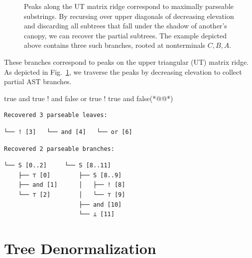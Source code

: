 \documentclass[sigplan,nonacm]{acmart}\settopmatter{printfolios=false,printccs=false,printacmref=false}
\begin{document}
\begin{figure}[H]
    \caption{Peaks along the UT matrix ridge correspond to maximally parseable substrings. By recursing over upper diagonals of decreasing elevation and discarding all subtrees that fall under the shadow of another's canopy, we can recover the partial subtrees. The example depicted above contains three such branches, rooted at nonterminals $C, B, A$.}\label{fig:peaks}
\end{figure}

\noindent These branches correspond to peaks on the upper triangular (UT) matrix ridge. As depicted in Fig.~\ref{fig:peaks}, we traverse the peaks by decreasing elevation to collect partial AST branches.

\begin{tidyinput}
    true and true ! and false or true ! true and false(*@\caret{ }@*)
\end{tidyinput}

\begin{verbatim}
Recovered 3 parseable leaves:
\end{verbatim}
\noindent\hspace{0.64cm}\hspace{1.70cm}\hspace{1.98cm}\vspace{-5pt}
\begin{verbatim}
└── ! [3]   └── and [4]   └── or [6]
\end{verbatim}

\begin{verbatim}
Recovered 2 parseable branches:
\end{verbatim}
\hspace{0.63cm}\hspace{2.48cm}\vspace{-5pt}
\begin{verbatim}
└── S [0..2]     └── S [8..11]
    ├── ⊤ [0]        ├── S [8..9]
    ├── and [1]      │   ├── ! [8]
    └── ⊤ [2]        │   └── ⊤ [9]
                     ├── and [10]
                     └── ⊥ [11]
\end{verbatim}

\section{Tree Denormalization}

\end{document}
